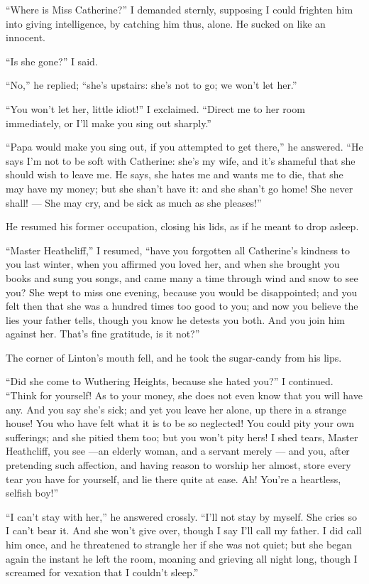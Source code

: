 \par “Where is Miss Catherine?” I demanded sternly, supposing I could frighten him into giving intelligence, by catching him thus, alone. He sucked on like an innocent.
\par “Is she gone?” I said.
\par “No,” he replied; “she's upstairs: she's not to go; we won't let her.”
\par “You won't let her, little idiot!” I exclaimed. “Direct me to her room immediately, or I'll make you sing out sharply.”
\par “Papa would make you sing out, if you attempted to get there,” he answered. “He says I'm not to be soft with Catherine: she's my wife, and it's shameful that she should wish to leave me. He says, she hates me and wants me to die, that she may have my money; but she shan't have it: and she shan't go home! She never shall! — She may cry, and be sick as much as she pleases!”
\par He resumed his former occupation, closing his lids, as if he meant to drop asleep.
\par “Master Heathcliff,” I resumed, “have you forgotten all Catherine's kindness to you last winter, when you affirmed you loved her, and when she brought you books and sung you songs, and came many a time through wind and snow to see you? She wept to miss one evening, because you would be disappointed; and you felt then that she was a hundred times too good to you; and now you believe the lies your father tells, though you know he detests you both. And you join him against her. That's fine gratitude, is it not?”
\par The corner of Linton's mouth fell, and he took the sugar-candy from his lips.
\par “Did she come to Wuthering Heights, because she hated you?” I continued. “Think for yourself! As to your money, she does not even know that you will have any. And you say she's sick; and yet you leave her alone, up there in a strange house! You who have felt what it is to be so neglected! You could pity your own sufferings; and she pitied them too; but you won't pity hers! I shed tears, Master Heathcliff, you see —an elderly woman, and a servant merely — and you, after pretending such affection, and having reason to worship her almost, store every tear you have for yourself, and lie there quite at ease. Ah! You're a heartless, selfish boy!”
\par “I can't stay with her,” he answered crossly. “I'll not stay by myself. She cries so I can't bear it. And she won't give over, though I say I'll call my father. I did call him once, and he threatened to strangle her if she was not quiet; but she began again the instant he left the room, moaning and grieving all night long, though I screamed for vexation that I couldn't sleep.”
